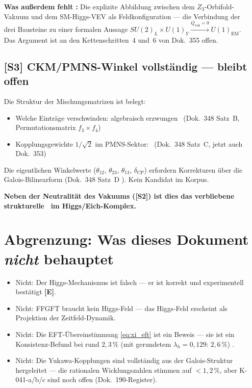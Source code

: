 \textbf{Was außerdem fehlt \SM:} Die explizite
Abbildung zwischen dem $Z_3$-Orbifold-Vakuum und dem SM-Higgs-VEV
als Feldkonfiguration --- die Verbindung der drei Bausteine zu einer
formalen Aussage $SU(2)_L\times U(1)_Y \xrightarrow{Q_\text{vak}=0} U(1)_\text{EM}$.
Das Argument ist an den Kettenschritten~4 und~6 von Dok.~355 offen.

\subsection*{[S3] CKM/PMNS-Winkel vollständig --- bleibt offen \SM}

Die Struktur der Mischungsmatrizen ist belegt:
\begin{itemize}
  \item Welche Einträge verschwinden: algebraisch erzwungen \BM\
    (Dok.~348 Satz~B, Permutationsmatrix $f_3\times f_4$)
  \item Kopplungsgewichte $1/\sqrt{2}$ im PMNS-Sektor: \BM\
    (Dok.~348 Satz~C, jetzt auch Dok.~353)
\end{itemize}
Die eigentlichen Winkelwerte ($\theta_{12}$, $\theta_{23}$, $\theta_{13}$,
$\delta_\text{CP}$) erfordern Korrekturen über die Galois-Bilinearform
(Dok.~348 Satz~D \SM). Kein Kandidat im Korpus.

\textbf{Neben der Neutralität des Vakuums ([S2]) ist dies das verbliebene strukturelle \SM\ im Higgs/Eich-Komplex.}

\section{Abgrenzung: Was dieses Dokument \emph{nicht} behauptet}

\begin{itemize}
  \item Nicht: Der Higgs-Mechanismus ist falsch --- er ist korrekt und
    experimentell bestätigt \textbf{[E]}.
  \item Nicht: FFGFT braucht kein Higgs-Feld --- das Higgs-Feld erscheint
    als Projektion der Zeitfeld-Dynamik.
  \item Nicht: Die EFT-Übereinstimmung \eqref{eq:xi_eft} ist ein Beweis ---
    sie ist ein Konsistenz-Befund bei rund $2{,}3\,\%$ (mit gerundetem $\lambda_h = 0{,}129$: $2{,}6\,\%$) \KM.
  \item Nicht: Die Yukawa-Kopplungen sind vollständig aus der Galois-Struktur
    hergeleitet --- die rationalen Wicklungszahlen stimmen auf $<1{,}2\,\%$,
    aber K-041-a/b/c sind noch offen (Dok.~190-Register).
\end{itemize}

